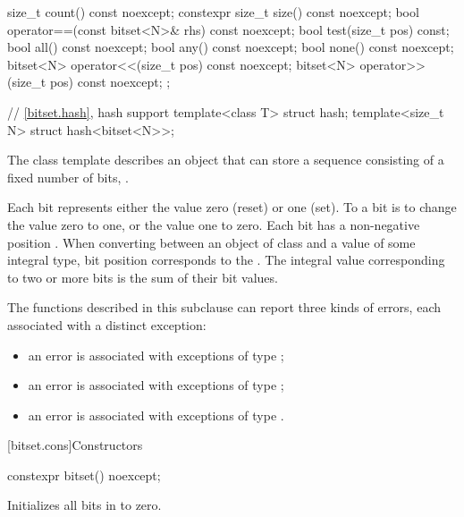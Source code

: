 \begin{codeblock}
{{    size_t count() const noexcept;
    constexpr size_t size() const noexcept;
    bool operator==(const bitset<N>& rhs) const noexcept;
    bool test(size_t pos) const;
    bool all() const noexcept;
    bool any() const noexcept;
    bool none() const noexcept;
    bitset<N> operator<<(size_t pos) const noexcept;
    bitset<N> operator>>(size_t pos) const noexcept;
  };

  // \ref{bitset.hash}, hash support
  template<class T> struct hash;
  template<size_t N> struct hash<bitset<N>>;
}
\end{codeblock}

\pnum
The class template
describes an object that can store a sequence consisting of a fixed number of
bits, .

\pnum
Each bit represents either the value zero (reset) or one (set).
To
a bit is to change the value zero to one, or the value one to
zero.
Each bit has a non-negative position .
When converting
between an object of class
and a value of some
integral type, bit position  corresponds to the
.
The integral value corresponding to two
or more bits is the sum of their bit values.

\pnum
The functions described in this subclause can report three kinds of
errors, each associated with a distinct exception:
\begin{itemize}
\item
an
error is associated with exceptions of type
;
%
\item
an
error is associated with exceptions of type
;
%
\item
an
error is associated with exceptions of type
.
%
\end{itemize}

[bitset.cons]{Constructors}

%
\begin{itemdecl}
constexpr bitset() noexcept;
\end{itemdecl}

\begin{itemdescr}
\pnum
\effects
Initializes all bits in  to zero.
\end{itemdescr}

